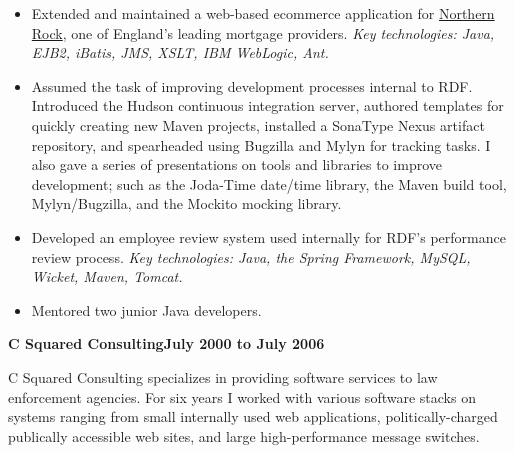 \documentclass[a4paper,12pt]{article}
\newcommand{\jobheld}[2]{\textbf{#1\hfill #2}\nopagebreak}
\newcommand{\clientwork}[2]{\emph{#1\hfill #2}\nopagebreak}
\begin{document}

\begin{itemize}

\item Extended and maintained a web-based ecommerce application for \href{http://www.northernrock.co.uk}{Northern Rock}, one of England's leading mortgage providers.  \emph{Key technologies: Java, EJB2, iBatis, JMS, XSLT, IBM WebLogic, Ant.}

\item Assumed the task of improving development processes internal to RDF. Introduced the Hudson continuous integration server, authored templates for quickly creating new Maven projects, installed a SonaType Nexus artifact repository, and spearheaded using Bugzilla and Mylyn for tracking tasks.  I also gave a series of presentations on tools and libraries to improve development; such as the Joda-Time date/time library, the Maven build tool, Mylyn/Bugzilla,  and the Mockito mocking library. 

\end{itemize}


\begin{itemize}
\item Developed an employee review system used internally for RDF's performance review process.  \emph{Key technologies: Java, the Spring Framework, MySQL, Wicket, Maven, Tomcat.}

\item Mentored two junior Java developers.

\end{itemize}

\jobheld{C Squared Consulting}{July 2000 to July 2006}

C Squared Consulting specializes in providing software services to law enforcement agencies.  For six years I worked with various software stacks on systems ranging from small internally used web applications, politically-charged publically accessible web sites, and large high-performance message switches.
\end{document}
